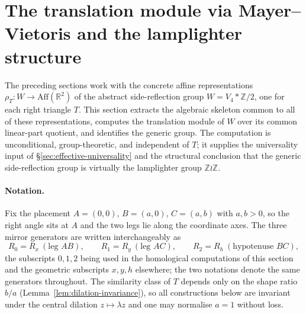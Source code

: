 \documentclass[11pt]{article}
\theoremstyle{plain}
\theoremstyle{definition}
\theoremstyle{remark}
\begin{document}
\section{The translation module via Mayer--Vietoris and the lamplighter structure}
\label{sec:translation-module}

The preceding sections work with the concrete affine representations
$\rho_T \colon W \to \mathrm{Aff}(\mathbb{R}^2)$ of the abstract
side-reflection group $W = V_4 * \mathbb{Z}/2$, one for each right
triangle $T$.  This section extracts the algebraic skeleton common to
all of these representations, computes the translation module of $W$
over its common linear-part quotient, and identifies the generic group.
The computation is unconditional, group-theoretic, and independent of
$T$; it supplies the universality input of \S\ref{sec:effective-universality} and the
structural conclusion that the generic side-reflection group is
virtually the lamplighter group $\mathbb{Z} \wr \mathbb{Z}$.

\paragraph{Notation.}
Fix the placement $A = (0,0)$, $B = (a,0)$, $C = (a,b)$ with
$a, b > 0$, so the right angle sits at $A$ and the two legs lie along
the coordinate axes.  The three mirror generators are written
interchangeably as
\[
R_0 = R_x \ (\text{leg } AB),
\qquad
R_1 = R_y \ (\text{leg } AC),
\qquad
R_2 = R_h \ (\text{hypotenuse } BC),
\]
the subscripts $0,1,2$ being used in the homological computations of
this section and the geometric subscripts $x,y,h$ elsewhere; the two
notations denote the same generators throughout.  The similarity class
of $T$ depends only on the shape ratio $b/a$
(Lemma~\ref{lem:dilation-invariance}), so all constructions below are
invariant under the central dilation $z \mapsto \lambda z$ and one may
normalise $a = 1$ without loss.
\end{document}
